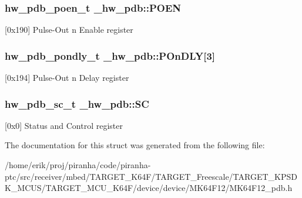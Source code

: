 \subsubsection[{\texorpdfstring{P\+O\+EN}{POEN}}]{ {\bf hw\+\_\+pdb\+\_\+poen\+\_\+t} \+\_\+hw\+\_\+pdb\+::\+P\+O\+EN}\hypertarget{struct__hw__pdb_a95efa2922bac7bf585014e369bbcff04}{}\label{struct__hw__pdb_a95efa2922bac7bf585014e369bbcff04}
\mbox{[}0x190\mbox{]} Pulse-\/\+Out n Enable register 
\subsubsection[{\texorpdfstring{P\+On\+D\+LY}{POnDLY}}]{ {\bf hw\+\_\+pdb\+\_\+pondly\+\_\+t} \+\_\+hw\+\_\+pdb\+::\+P\+On\+D\+LY\mbox{[}3\mbox{]}}\hypertarget{struct__hw__pdb_a29e1cc44c17145f1ec6c1a915216d532}{}\label{struct__hw__pdb_a29e1cc44c17145f1ec6c1a915216d532}
\mbox{[}0x194\mbox{]} Pulse-\/\+Out n Delay register 
\subsubsection[{\texorpdfstring{SC}{SC}}]{ {\bf hw\+\_\+pdb\+\_\+sc\+\_\+t} \+\_\+hw\+\_\+pdb\+::\+SC}\hypertarget{struct__hw__pdb_a85e39451c651f57f7228210e6ed72292}{}\label{struct__hw__pdb_a85e39451c651f57f7228210e6ed72292}
\mbox{[}0x0\mbox{]} Status and Control register 

The documentation for this struct was generated from the following file\+:\begin{DoxyCompactItemize}
\item 
/home/erik/proj/piranha/code/piranha-\/ptc/src/receiver/mbed/\+T\+A\+R\+G\+E\+T\+\_\+\+K64\+F/\+T\+A\+R\+G\+E\+T\+\_\+\+Freescale/\+T\+A\+R\+G\+E\+T\+\_\+\+K\+P\+S\+D\+K\+\_\+\+M\+C\+U\+S/\+T\+A\+R\+G\+E\+T\+\_\+\+M\+C\+U\+\_\+\+K64\+F/device/device/\+M\+K64\+F12/M\+K64\+F12\+\_\+pdb.\+h\end{DoxyCompactItemize}
